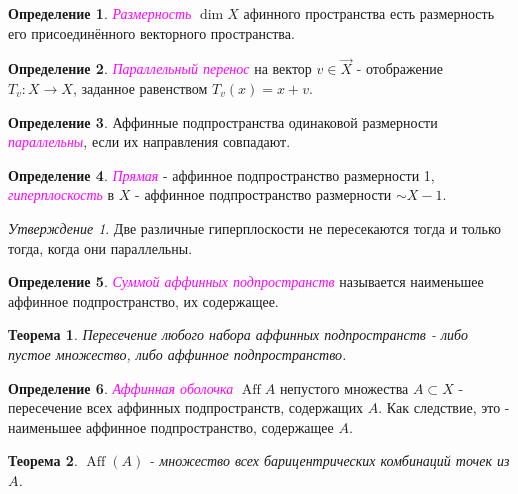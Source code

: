 \documentclass[a4paper,100pt]{article}
\theoremstyle{indented}
\newtheorem{theorem}{Теорема}
\theoremstyle{definition}
\newtheorem{defn}{Определение}
\theoremstyle{remark}
\newtheorem{stat}{Утверждение}
\DeclareMathOperator{\ra}{\rightarrow}
\DeclareMathOperator{\Aff}{Aff}
\begin{document}
\begin{defn}
    \textit{\textcolor{magenta}{\hypertarget{s15}{Размерность}}} $\dim X$ афинного пространства есть размерность его присоединённого векторного пространства.
\end{defn}

\begin{defn}
    \textit{\textcolor{magenta}{\hypertarget{s16}{Параллельный перенос}}} на вектор $v\in \vec{X}$ - отображение $T_v:X\ra X$, заданное равенством $T_v(x)=x+v$. 
\end{defn}

\begin{defn}
    Аффинные подпространства одинаковой размерности \textit{\textcolor{magenta}{\hypertarget{s17}{параллельны}}}, если их направления совпадают.
\end{defn}

\begin{defn}
    \textit{\textcolor{magenta}{\hypertarget{s18}{Прямая}}} - аффинное подпространство размерности 1, \textit{\textcolor{magenta}{\hypertarget{s19}{гиперплоскость}}} в $X$ - аффинное подпространство размерности $\sim X - 1$. 
\end{defn}

\begin{stat}
    Две различные гиперплоскости не пересекаются тогда и только тогда, когда они параллельны.
\end{stat}

\begin{defn}
    \textit{\textcolor{magenta}{\hypertarget{s20}{Суммой аффинных подпространств}}} называется наименьшее аффинное подпространство, их содержащее.
\end{defn}

\begin{theorem}
    Пересечение любого набора аффинных подпространств - либо пустое множество, либо аффинное подпространство.
\end{theorem}

\begin{defn}
    \textit{\textcolor{magenta}{\hypertarget{s21}{Аффинная оболочка}}} $\Aff{A}$ непустого множества $A\subset X$ - пересечение всех аффинных подпространств, содержащих $A$. Как следствие, это - наименьшее аффинное подпространство, содержащее $A$. 
\end{defn}

\begin{theorem}
    $\Aff(A)$ - множество всех барицентрических комбинаций точек из $A$. 
\end{theorem}
\end{document}
